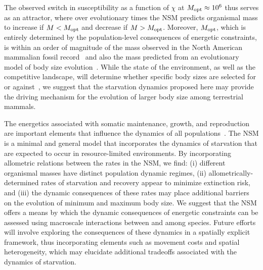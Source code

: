 \documentclass{pnastwo}
\begin{document}
\begin{article}
The observed switch in susceptibility as a function of $\chi$ at
$M_{\rm opt}\approx10^6$ thus serves as an attractor, where over evolutionary
times the NSM predicts organismal mass to increase if $M<M_{\rm opt}$ and
decrease if $M>M_{\rm opt}$.  Moreover, $M_{\rm opt}$, which is entirely
determined by the population-level consequences of energetic constraints, is
within an order of magnitude of the mass observed in the North American
mammalian fossil record~\cite{Alroy:1998p1594} and also the mass predicted
from an evolutionary model of body size evolution~\cite{Clauset:2009fh}.
While the state of the environment, as well as the competitive landscape,
will determine whether specific body sizes are selected for or
against~\cite{Saarinen:2014br}, we suggest that the starvation dynamics
proposed here may provide the driving mechanism for the evolution of larger
body size among terrestrial mammals.

The energetics associated with somatic maintenance, growth, and reproduction
are important elements that influence the dynamics of all
populations~\cite{Stearns:1989ip}.  The NSM is a minimal and general model
that incorporates the dynamics of starvation that are expected to occur in
resource-limited environments.  By incorporating allometric relations between
the rates in the NSM, we find: (i) different organismal masses have distinct
population dynamic regimes, (ii) allometrically-determined rates of
starvation and recovery appear to minimize extinction risk, and (iii) the
dynamic consequences of these rates may place additional barriers on the
evolution of minimum and maximum body size.  We suggest that the NSM offers a
means by which the dynamic consequences of energetic constraints can be
assessed using macroscale interactions between and among species.  Future
efforts will involve exploring the consequences of these dynamics in a
spatially explicit framework, thus incorporating elements such as movement
costs and spatial heterogeneity, which may elucidate additional tradeoffs
associated with the dynamics of starvation.

%
%
%
%
%
%
%
%
%
%
%
%
%


\end{article}
\end{document}
